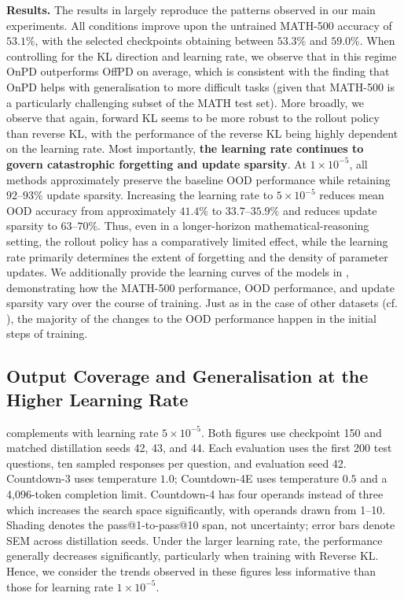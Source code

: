 \documentclass{article} %
\theoremstyle{plain}
\theoremstyle{definition}
\theoremstyle{remark}
\begin{document}
\textbf{Results.} 
The results in  largely reproduce the patterns observed in our main experiments. All conditions improve upon the untrained MATH-500 accuracy of $53.1\%$, with the selected checkpoints obtaining between $53.3\%$ and $59.0\%$. When controlling for the KL direction and learning rate, we observe that in this regime OnPD outperforms OffPD on average, which is consistent with the finding that OnPD helps with generalisation to more difficult tasks (given that MATH-500 is a particularly challenging subset of the MATH test set). More broadly, we observe that again, forward KL seems to be more robust to the rollout policy than reverse KL, with the performance of the reverse KL being highly dependent on the learning rate. Most importantly, \textbf{the learning rate continues to govern catastrophic forgetting and update sparsity}. At $1\times10^{-5}$, all methods approximately preserve the baseline OOD performance while retaining $92$--$93\%$ update sparsity. Increasing the learning rate to $5\times10^{-5}$ reduces mean OOD accuracy from approximately $41.4\%$ to $33.7$--$35.9\%$ and reduces update sparsity to $63$--$70\%$. Thus, even in a longer-horizon mathematical-reasoning setting, the rollout policy has a comparatively limited effect, while the learning rate primarily determines the extent of forgetting and the density of parameter updates. We additionally provide the learning curves of the models in , demonstrating how the MATH-500 performance, OOD performance, and update sparsity vary over the course of training. Just as in the case of other datasets (cf. ), the majority of the changes to the OOD performance happen in the initial steps of training.

\clearpage
\subsection{Output Coverage and Generalisation at the Higher Learning Rate}
\label{app:exp:countdown_spectrum}

 complements  with learning rate $5\times10^{-5}$. Both figures use checkpoint 150 and matched distillation seeds 42, 43, and 44. Each evaluation uses the first 200 test questions, ten sampled responses per question, and evaluation seed 42. Countdown-3 uses temperature $1.0$; Countdown-4E uses temperature $0.5$ and a 4,096-token completion limit. Countdown-4 has four operands instead of three which increases the search space significantly, with operands drawn from 1--10. Shading denotes the pass@1-to-pass@10 span, not uncertainty; error bars denote SEM across distillation seeds. Under the larger learning rate, the performance generally decreases significantly, particularly when training with Reverse KL. Hence, we consider the trends observed in these figures less informative than those for learning rate $1\times10^{-5}$.
\end{document}
